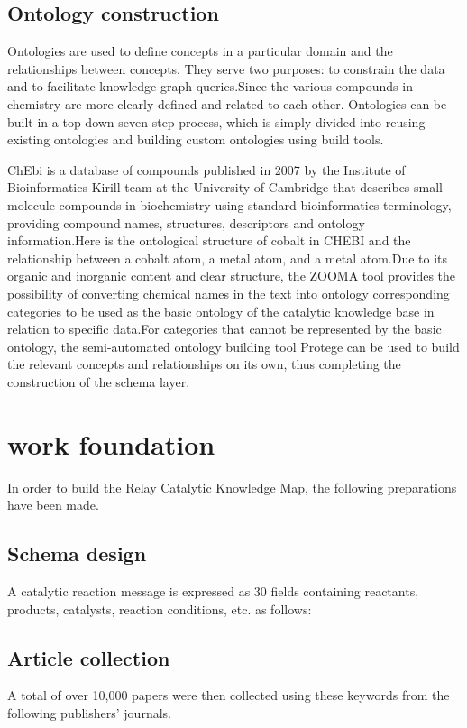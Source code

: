 \documentclass[%
 aip,
 jmp,%
 amsmath,amssymb,
 reprint,%
]{revtex4-2}
\begin{document}
\subsection{Ontology construction}
Ontologies are used to define concepts in a particular domain and the relationships between concepts. They serve two purposes: to constrain 
the data and to facilitate knowledge graph queries.Since the various compounds in chemistry are more clearly defined and related to each other.
Ontologies can be built in a top-down seven-step process, which is simply divided into reusing existing ontologies and building custom 
ontologies using build tools.

ChEbi is a database of compounds published in 2007 by the Institute of Bioinformatics-Kirill team at the University of Cambridge that 
describes small molecule compounds in biochemistry using standard bioinformatics terminology, providing compound names, structures, 
descriptors and ontology information.Here is the ontological structure of cobalt in CHEBI and the relationship between a cobalt atom, 
a metal atom, and a metal atom.Due to its organic and inorganic content and clear structure, the ZOOMA tool provides the possibility 
of converting chemical names in the text into ontology corresponding categories to be used as the basic ontology of the catalytic 
knowledge base in relation to specific data.For categories that cannot be represented by the basic ontology, the semi-automated ontology 
building tool Protege can be used to build the relevant concepts and relationships on its own, thus completing the construction of the 
schema layer.

\section{work foundation}
In order to build the Relay Catalytic Knowledge Map, the following preparations have been made.

\subsection{Schema design}
A catalytic reaction message is expressed as 30 fields containing reactants, products, catalysts, reaction conditions, etc. as follows:

\subsection{Article collection}
A total of over 10,000 papers were then collected using these keywords from the following publishers' journals.
\end{document}
